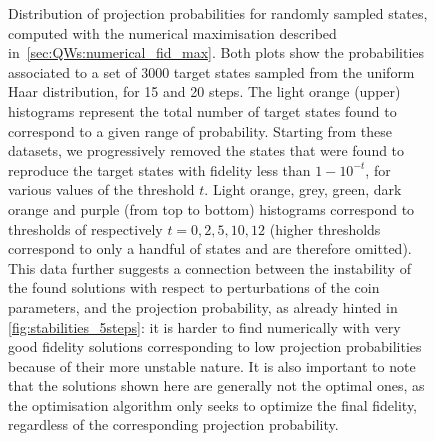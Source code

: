 \begin{figure}[]
    \centering
    \begin{minipage}[b]{0.5\textwidth}
    \end{minipage}%
    \begin{minipage}[b]{0.5\textwidth}
    \end{minipage}
    \caption{
        Distribution of projection probabilities for randomly sampled states, computed with the numerical maximisation described in~\cref{sec:QWs:numerical_fid_max}.
        Both plots show the probabilities associated to a set of 3000 target states sampled from the uniform Haar distribution, for 15 and 20 steps.
        The light orange (upper) histograms represent the total number of target states found to correspond to a given range of probability.
        Starting from these datasets, we progressively removed the states that were found to reproduce the target states with fidelity less than $1 - 10^{-t}$, for various values of the threshold $t$.
        Light orange, grey, green, dark orange and purple (from top to bottom) histograms correspond to thresholds of respectively $t = 0, 2, 5, 10, 12$ (higher thresholds correspond to only a handful of states and are therefore omitted).
        This data further suggests a connection between the instability of the found solutions with respect to perturbations of the coin parameters, and the projection probability, as already hinted in \cref{fig:stabilities_5steps}:
        it is harder to find numerically with very good fidelity solutions corresponding to low projection probabilities because of their more unstable nature.
        It is also important to note that the solutions shown here are generally not the optimal ones,
        as the optimisation algorithm only seeks to optimize the final fidelity,
        regardless of the corresponding projection probability.
    }
    \label{fig:prob_histograms_nmaximize}
\end{figure}